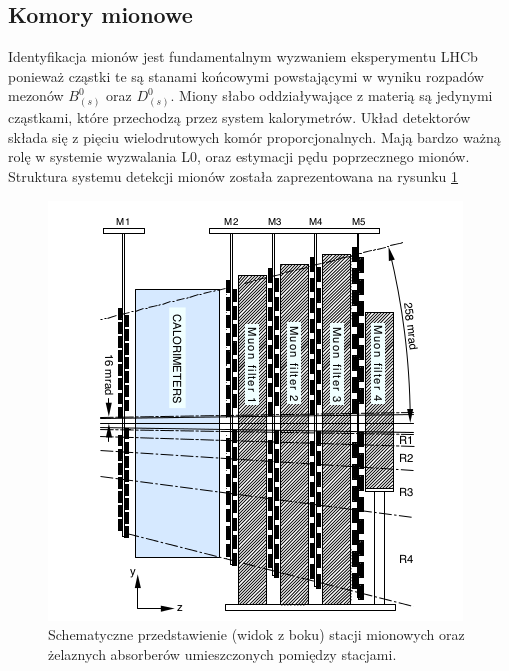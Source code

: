 \subsection{Komory mionowe}
Identyfikacja mionów jest fundamentalnym wyzwaniem eksperymentu LHCb ponieważ cząstki te są stanami końcowymi powstającymi w wyniku rozpadów mezonów $B_{(s)}^0$ oraz $D_{(s)}^0$. Miony słabo oddziaływające z materią są jedynymi cząstkami, które przechodzą przez system kalorymetrów. Układ detektorów składa się z pięciu wielodrutowych komór proporcjonalnych. Mają bardzo ważną rolę w systemie wyzwalania L0, oraz estymacji pędu poprzecznego mionów. Struktura systemu detekcji mionów została zaprezentowana na rysunku \ref{fig:Muon}
\begin{figure}[H] 
  \centering
  \includegraphics[scale=0.6]{rozdzial2/Muon.png}
  \caption{Schematyczne przedstawienie (widok z boku) stacji mionowych oraz żelaznych absorberów umieszczonych pomiędzy stacjami.}
  \label{fig:Muon}
\end{figure}


